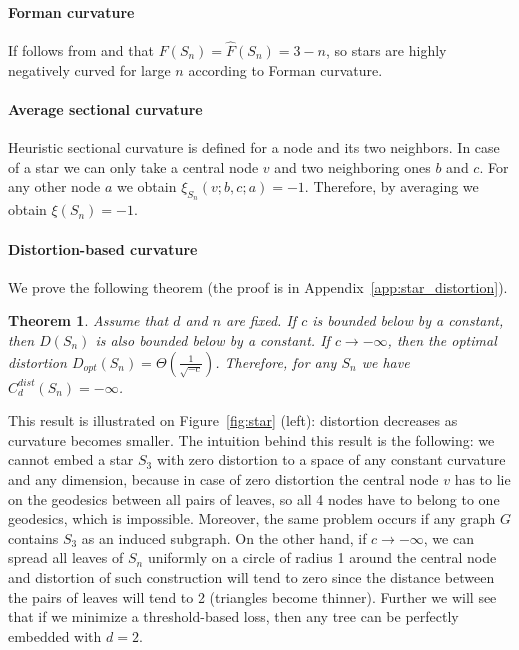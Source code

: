 \documentclass{article} %
\newtheorem{theorem}{Theorem}[section]
\begin{document}
\paragraph{Forman curvature}
If follows from  and  that
$F(S_n) = \hat F(S_n) = 3-n$, so stars are highly negatively curved for large $n$ according to Forman curvature.

\paragraph{Average sectional curvature}

Heuristic sectional curvature is defined for a node and its two neighbors. In case of a star we can only take a central node $v$ and two neighboring ones $b$ and $c$. For any other node $a$ we obtain $\xi_{S_n}(v;b,c;a) = -1$. Therefore, by averaging we obtain $\xi(S_n) = -1$.

\paragraph{Distortion-based curvature} 
We prove the following theorem (the proof is in Appendix~\ref{app:star_distortion}).

\begin{theorem}\label{thm:star_distortion}
Assume that $d$ and $n$ are fixed.
If $c$ is bounded below by a constant, then $D(S_n)$ is also bounded below by a constant. 
If $c \to -\infty$, then the optimal distortion $D_{opt}(S_n) = \Theta\left(\frac{1}{\sqrt{-c}}\right)$.
Therefore, for any $S_n$ we have $C_d^{dist}(S_n) = -\infty$.
\end{theorem}

This result is illustrated on Figure~\ref{fig:star} (left): distortion decreases as curvature becomes smaller.
The intuition behind this result is the following: we cannot embed a star $S_3$ with zero distortion to a space of any constant curvature and any dimension, because in case of zero distortion the central node $v$ has to lie on the geodesics between all pairs of leaves, so all 4 nodes have to belong to one geodesics, which is impossible. Moreover, the same problem occurs if any graph $G$ contains $S_3$ as an induced subgraph.
On the other hand, if $c \to -\infty$, we can spread all leaves of $S_n$ uniformly on a circle of radius 1 around the central node and distortion of such construction will tend to zero since the distance between the pairs of leaves will tend to 2 (triangles become thinner). 
Further we will see that if we minimize a threshold-based loss, then any tree can be perfectly embedded with $d = 2$.
\end{document}
